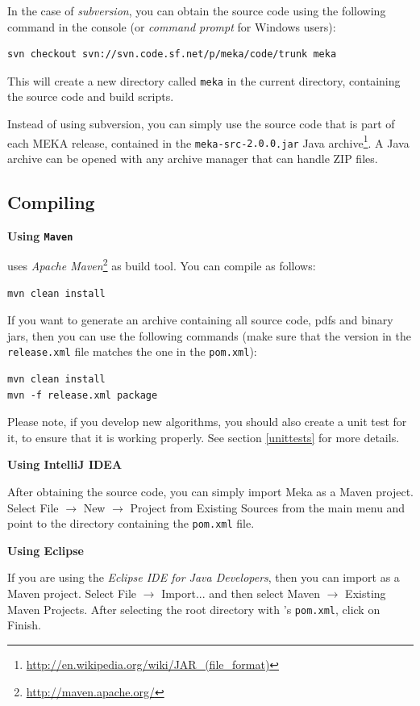 \documentclass[11pt]{article}
\newcommand{\MEKA}{Meka}
\def\version{{\tt 2.0.0}}
\newcommand{\heading}[1]{
    \vspace{0.3cm} \noindent \textbf{#1} \newline
}
\begin{document}
\noindent In the case of \textit{subversion}, you can obtain the source code using the following command in the console (or \textit{command prompt} for Windows users):
\begin{lstlisting}
svn checkout svn://svn.code.sf.net/p/meka/code/trunk meka
\end{lstlisting}
This will create a new directory called \texttt{meka} in the current directory, containing the source code and build scripts.

Instead of using subversion, you can simply use the source code that is part of each MEKA release, contained in the \texttt{meka-src-\version.jar} Java archive\footnote{\url{http://en.wikipedia.org/wiki/JAR\_(file\_format)}}. A Java archive can be opened with any archive manager that can handle ZIP files.

\subsection{Compiling}
\label{compiling}
\heading{Using \texttt{Maven}}
\framework{\MEKA} uses \textit{Apache Maven}\footnote{\url{http://maven.apache.org/}} as build tool. You can compile \framework{\MEKA} as follows:
\begin{lstlisting}
mvn clean install
\end{lstlisting}
If you want to generate an archive containing all source code, pdfs and binary jars, then you can use the following commands
(make sure that the version in the \texttt{release.xml} file matches the one in the \texttt{pom.xml}):
\begin{lstlisting}
mvn clean install
mvn -f release.xml package
\end{lstlisting}
Please note, if you develop new algorithms, you should also create a unit test for it, to ensure that it is working properly. See section \ref{unittests} for more details.

\heading{Using IntelliJ IDEA}
After obtaining the source code, you can simply import Meka as a Maven project.
Select \textsf{File $\rightarrow$ New $\rightarrow$ Project from Existing Sources} from the main menu and point to
the directory containing the \texttt{pom.xml} file.

\heading{Using Eclipse}
If you are using the \textit{Eclipse IDE for Java Developers}, then you can import as a Maven project.
Select \textsf{File $\rightarrow$ Import...} and then select {Maven $\rightarrow$ Existing Maven Projects}.
After selecting the root directory with \framework{\MEKA}'s \texttt{pom.xml}, click on \textsf{Finish}.
\end{document}
